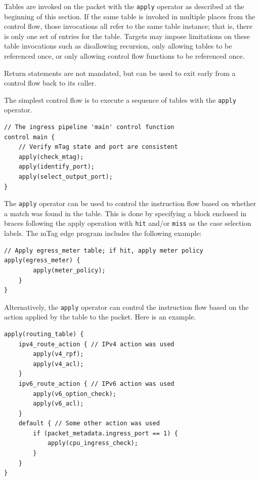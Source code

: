 \documentclass[12pt]{article}
\begin{document}
Tables are invoked on the packet with the \texttt{apply} operator as described at 
the beginning of this section. If the same table is invoked in multiple places 
from the control flow, those invocations all refer to the same table instance; 
that is, there is only one set of \matchaction  entries for the table. Targets
may impose limitations on these table invocations such as disallowing recursion,
only allowing tables to be referenced once, or only allowing control flow
functions to be referenced once.

Return statements are not mandated, but can be used to exit early from a control
flow back to its caller.

The simplest control flow is to execute a sequence of tables with the \texttt{apply} operator.

\begin{lstlisting}[style=P4style]
// The ingress pipeline 'main' control function
control main {
    // Verify mTag state and port are consistent
    apply(check_mtag);
    apply(identify_port);
    apply(select_output_port);
}
\end{lstlisting}


The \texttt{apply} operator can be used to control the instruction flow based on whether 
a match was found in the table. This is done by specifying a block enclosed 
in braces following the apply operation with \texttt{hit} and/or \texttt{miss} as the case 
selection labels.  The mTag edge program includes the following example:

\begin{lstlisting}[style=P4style]
// Apply egress_meter table; if hit, apply meter policy
apply(egress_meter) {
        apply(meter_policy);
    }
}
\end{lstlisting}


Alternatively, the \texttt{apply} operator can control the instruction flow based 
on the action applied by the table to the packet. Here is an example.

\begin{lstlisting}[style=P4style]
apply(routing_table) {
    ipv4_route_action { // IPv4 action was used
        apply(v4_rpf);
        apply(v4_acl);
    }
    ipv6_route_action { // IPv6 action was used
        apply(v6_option_check);
        apply(v6_acl);
    }
    default { // Some other action was used
        if (packet_metadata.ingress_port == 1) {
            apply(cpu_ingress_check);
        }
    }
}
\end{lstlisting}
\end{document}
